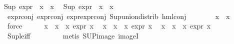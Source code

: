 \begin{isabellebody}
{\isachardoublequoteopen}Sup\ {\isacharparenleft}{\kern0pt}{\isacharparenleft}{\kern0pt}expr{\isacharunderscore}{\kern0pt}{}\ {\isasymcirc}\ x{}{\isacharparenright}{\kern0pt}\ {\isacharbackquote}{\kern0pt}\ x{}{\isacharparenright}{\kern0pt}\ {\isasymle}\ {}{\isachardoublequoteclose}\isanewline
{\isachardoublequoteopen}Sup\ {\isacharparenleft}{\kern0pt}{\isacharparenleft}{\kern0pt}expr{\isacharunderscore}{\kern0pt}{}\ {\isasymcirc}\ x{}{\isacharparenright}{\kern0pt}\ {\isacharbackquote}{\kern0pt}\ x{}{\isacharparenright}{\kern0pt}\ {\isasymle}\ {}{\isachardoublequoteclose}\isanewline
\ \ \ \ \ \ \isamarkupfalse%
\ expr{\isacharunderscore}{\kern0pt}{}{\isacharunderscore}{\kern0pt}conj\ expr{\isacharunderscore}{\kern0pt}{}{\isacharunderscore}{\kern0pt}conj\ expr{\isacharunderscore}{\kern0pt}{}{\isachardot}{\kern0pt}expr{\isacharunderscore}{\kern0pt}{}{\isacharunderscore}{\kern0pt}conj\ Sup{\isacharunderscore}{\kern0pt}union{\isacharunderscore}{\kern0pt}distrib\ hml{\isacharunderscore}{\kern0pt}conj\isanewline
\ \ \ \ \ \ \isamarkupfalse%
\ {\isacartoucheopen}x{}\ {\isacharbackquote}{\kern0pt}\ x{}\ {\isacharequal}{\kern0pt}\ {\isacharbraceleft}{\kern0pt}{\isacharbraceright}{\kern0pt}{\isacartoucheclose}\ \isamarkupfalse%
\ force{\isacharplus}{\kern0pt}\isanewline
\ \ \ \ \isamarkupfalse%
\ {\isachardoublequoteopen}{\isasymforall}x\ {\isasymin}\ x{}\ {\isacharbackquote}{\kern0pt}\ x{}{\isachardot}{\kern0pt}\ expr{\isacharunderscore}{\kern0pt}{}\ x\ {\isasymle}\ {}{\isachardoublequoteclose}\isanewline
{\isachardoublequoteopen}{\isasymforall}x\ {\isasymin}\ x{}\ {\isacharbackquote}{\kern0pt}\ x{}{\isachardot}{\kern0pt}\ expr{\isacharunderscore}{\kern0pt}{}\ x\ {\isasymle}\ {}{\isachardoublequoteclose}\isanewline
{\isachardoublequoteopen}{\isasymforall}x\ {\isasymin}\ x{}\ {\isacharbackquote}{\kern0pt}\ x{}{\isachardot}{\kern0pt}\ expr{\isacharunderscore}{\kern0pt}{}\ x\ {\isasymle}\ {}{\isachardoublequoteclose}\isanewline
\ \ \ \ \ \ \isamarkupfalse%
\ Sup{\isacharunderscore}{\kern0pt}le{\isacharunderscore}{\kern0pt}iff\ \isanewline
\ \ \ \ \ \ \isamarkupfalse%
\ {\isacharparenleft}{\kern0pt}metis\ SUP{\isacharunderscore}{\kern0pt}image\ imageI{\isacharparenright}{\kern0pt}{\isacharplus}{\kern0pt}\isanewline

\end{isabellebody}
